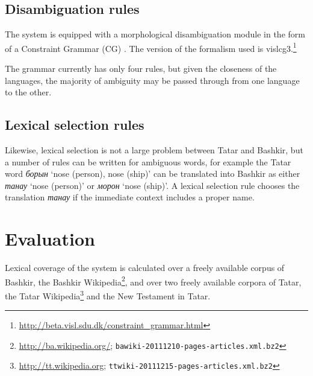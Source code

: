 \documentclass[11pt,a4paper]{article}
\begin{document}
\subsection{Disambiguation rules}

The system is equipped with a morphological disambiguation module in the form of a 
Constraint Grammar (CG) \cite{karlsson95}. The version of the formalism used is 
vislcg3.\footnote{\url{http://beta.visl.sdu.dk/constraint_grammar.html}}

The grammar currently has only four rules, but given the closeness of the languages, the 
majority of ambiguity may be passed through from one language to the other.

\subsection{Lexical selection rules}

Likewise, lexical selection is not a large problem between Tatar and Bashkir, but a 
number of rules can be written for ambiguous words, for example the Tatar 
word \emph{борын} `nose (person), nose (ship)' can be translated into Bashkir 
as either \emph{танау} `nose (person)' or \emph{морон} `nose (ship)'. A lexical selection
rule chooses the translation \emph{танау} if the immediate context includes a proper 
name.





\section{Evaluation}
\label{sec:eval}

Lexical coverage of the system is calculated over a freely available corpus of Bashkir, the Bashkir
Wikipedia\footnote{\url{http://ba.wikipedia.org/}; {\tt bawiki-20111210-pages-articles.xml.bz2}}, and over two freely available corpora of 
Tatar, the Tatar Wikipedia\footnote{\url{http://tt.wikipedia.org}; {\tt ttwiki-20111215-pages-articles.xml.bz2}} and the New Testament in Tatar.
\end{document}
